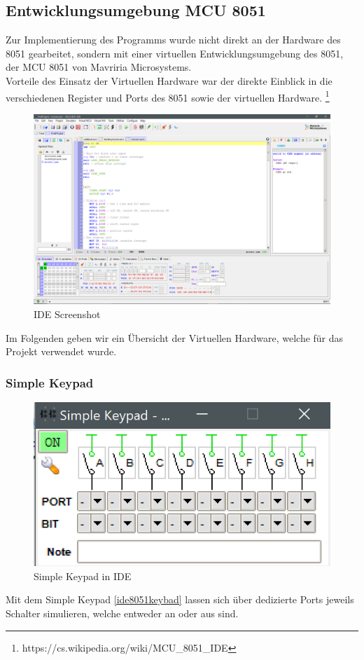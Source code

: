 \documentclass[a4paper,12pt]{article}
\begin{document}
	\subsection{Entwicklungsumgebung MCU 8051}
	Zur Implementierung des Programms wurde nicht direkt an der Hardware des 8051 gearbeitet, sondern mit einer virtuellen Entwicklungsumgebung des 8051, der MCU 8051 von Mavriria Microsystems.\\
	Vorteile des Einsatz der Virtuellen Hardware war der direkte Einblick in die verschiedenen Register und Ports des 8051 sowie der virtuellen Hardware. \footnote{https://cs.wikipedia.org/wiki/MCU_8051_IDE}
	\begin{figure}[bt]
		\centering
		\includegraphics[width=0.7\linewidth]{Bilder/IDE8051}
		\caption[IDE Screenshot]{IDE Screenshot}
		\label{fig:ide8051}
	\end{figure}

	Im Folgenden geben wir ein Übersicht der Virtuellen Hardware, welche für das Projekt verwendet wurde.
	\subsubsection{Simple Keypad}
	\begin{figure}[bt]
		\centering
		\includegraphics[width=0.7\linewidth]{Bilder/keypad}
		\caption[IDE Screenshot]{Simple Keypad in IDE}
		\label{fig:ide8051keybad}
	\end{figure}
	Mit dem Simple Keypad \ref{ide8051keybad} lassen sich über dedizierte Ports jeweils Schalter simulieren, welche entweder an oder aus sind. 
	
\end{document}
